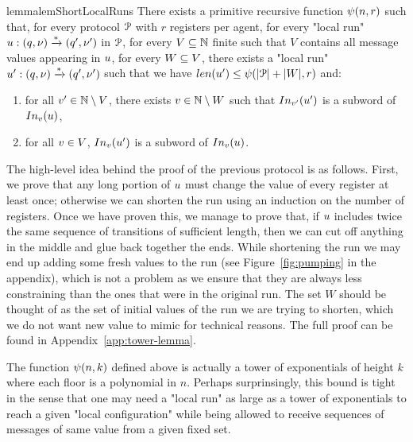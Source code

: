 \begin{restatable}{lemma}{lemShortLocalRuns}
	\label{lem:short-local-runs}
	There exists a primitive recursive function $\psi(n,r)$ such that, for every protocol $\mathcal{P}$ with $r$ registers per agent, for every "local run" $u: (q, \nu) \xrightarrow{*} (q', \nu')$ in $\mathcal{P}$, for every $V \subseteq \mathbb{N}$ finite such that $V$ contains all message values appearing in $u$,  for every $W \subseteq V$, there exists a "local run" $u': (q, \nu) \xrightarrow{*} (q', \nu')$ such that we have $\length{\localrun'} \leq \towerfun(\size{\prot} + \size{\Vinit},r)$ and:
	\begin{enumerate}
		\item \label{item:shorterrun_anyvalue} for all $v' \in \mathbb{N} \setminus V$, there exists $v \in \mathbb{N} \setminus W$ such that $\vinput{\aval'}{\localrun'}$ is a subword of $\vinput{\aval}{\localrun}$,
		\item \label{item:shorterrun_oldvalues} for all $v \in V$, $\vinput{\aval}{\localrun'}$ is a subword of $\vinput{\aval}{\localrun}$. 
	\end{enumerate}
\end{restatable}


The high-level idea behind the proof of the previous protocol is as follows. First, we prove that any long portion of $u$ must change the value of every register at least once; otherwise we can shorten the run using an induction on the number of registers. Once we have proven this, we manage to prove that, if $u$ includes twice the same sequence of transitions of sufficient length, then we can cut off anything in the middle and glue back together the ends. While shortening the run we may end up adding some fresh values to the run (see Figure~\ref{fig:pumping} in the appendix), which is not a problem as we ensure that they are always less constraining than the ones that were in the original run. The set $W$ should be thought of as the set of initial values of the run we are trying to shorten, which we do not want new value to mimic for technical reasons.
The full proof can be found in Appendix~\ref{app:tower-lemma}.

\begin{remark}
The function $\psi(n,k)$ defined above is actually a tower of exponentials of height $k$ where each floor is a polynomial in $n$. Perhaps surprinsingly, this bound is tight in the sense that one may need a "local run" as large as a tower of exponentials to reach a given "local configuration" while being allowed to receive sequences of messages of same value from a given fixed set. 
\end{remark}

